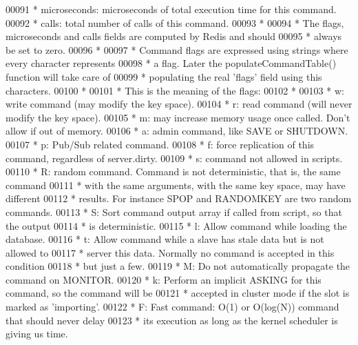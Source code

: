 \begin{DoxyCode}
00091 \textcolor{comment}{ * microseconds: microseconds of total execution time for this command.}
00092 \textcolor{comment}{ * calls: total number of calls of this command.}
00093 \textcolor{comment}{ *}
00094 \textcolor{comment}{ * The flags, microseconds and calls fields are computed by Redis and should}
00095 \textcolor{comment}{ * always be set to zero.}
00096 \textcolor{comment}{ *}
00097 \textcolor{comment}{ * Command flags are expressed using strings where every character represents}
00098 \textcolor{comment}{ * a flag. Later the populateCommandTable() function will take care of}
00099 \textcolor{comment}{ * populating the real 'flags' field using this characters.}
00100 \textcolor{comment}{ *}
00101 \textcolor{comment}{ * This is the meaning of the flags:}
00102 \textcolor{comment}{ *}
00103 \textcolor{comment}{ * w: write command (may modify the key space).}
00104 \textcolor{comment}{ * r: read command  (will never modify the key space).}
00105 \textcolor{comment}{ * m: may increase memory usage once called. Don't allow if out of memory.}
00106 \textcolor{comment}{ * a: admin command, like SAVE or SHUTDOWN.}
00107 \textcolor{comment}{ * p: Pub/Sub related command.}
00108 \textcolor{comment}{ * f: force replication of this command, regardless of server.dirty.}
00109 \textcolor{comment}{ * s: command not allowed in scripts.}
00110 \textcolor{comment}{ * R: random command. Command is not deterministic, that is, the same command}
00111 \textcolor{comment}{ *    with the same arguments, with the same key space, may have different}
00112 \textcolor{comment}{ *    results. For instance SPOP and RANDOMKEY are two random commands.}
00113 \textcolor{comment}{ * S: Sort command output array if called from script, so that the output}
00114 \textcolor{comment}{ *    is deterministic.}
00115 \textcolor{comment}{ * l: Allow command while loading the database.}
00116 \textcolor{comment}{ * t: Allow command while a slave has stale data but is not allowed to}
00117 \textcolor{comment}{ *    server this data. Normally no command is accepted in this condition}
00118 \textcolor{comment}{ *    but just a few.}
00119 \textcolor{comment}{ * M: Do not automatically propagate the command on MONITOR.}
00120 \textcolor{comment}{ * k: Perform an implicit ASKING for this command, so the command will be}
00121 \textcolor{comment}{ *    accepted in cluster mode if the slot is marked as 'importing'.}
00122 \textcolor{comment}{ * F: Fast command: O(1) or O(log(N)) command that should never delay}
00123 \textcolor{comment}{ *    its execution as long as the kernel scheduler is giving us time.}

\end{DoxyCode}

